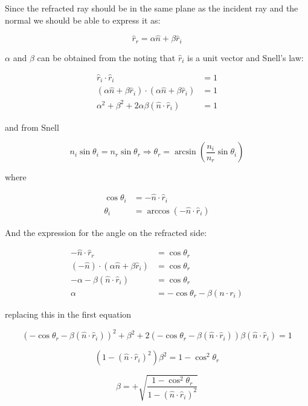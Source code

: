 \documentclass[10pt,a4paper]{article}
\begin{document}
Since the refracted ray should be in the same plane as the incident ray and the normal we should be able to express it as:

\[
\hat r_r = \alpha  \hat n + \beta \hat r_i
\]

$\alpha$ and $\beta$ can be obtained from the noting that $\hat r_i$ is a unit vector 
and Snell's law:

\begin{align*}
\hat r_i \cdot \hat r_i                                                   & = 1 \\
(\alpha  \hat n + \beta \hat r_i) \cdot (\alpha  \hat n + \beta \hat r_i) & = 1 \\
\alpha^2 + \beta^2 + 2 \alpha \beta (\hat n \cdot \hat r_i)               & = 1 
\end{align*}


and from Snell

\[
n_i \sin{\theta_i} = n_r \sin{\theta_r}
\Rightarrow
\theta_r = \arcsin{ \left( \dfrac{n_i}{n_r}\sin{\theta_i} \right) }
\]

where

\begin{align*}
\cos \theta_i  & = -\hat n \cdot \hat r_i                          \\
\theta_i       & = \arccos{\left( -\hat n \cdot \hat r_i \right)} 
\end{align*}



And the expression for the angle on the refracted side:

\begin{align*}
-\hat n \cdot \hat r_r                          & = \cos\theta_r  \\
(-\hat n)\cdot (\alpha \hat n +\beta \hat r_i)  & = \cos\theta_r  \\
-\alpha-\beta (\hat n\cdot \hat r_i)            & = \cos\theta_r  \\
\alpha                           & = -\cos\theta_r -\beta(n \cdot r_i) 
\end{align*}


replacing this in the first equation

\[
(- \cos\theta_r - \beta (\hat n \cdot \hat r_i))^2+ \beta^2 + 2(-\cos\theta_r-\beta(\hat n\cdot \hat r_i))\beta(\hat n \cdot \hat r_i)=1
\]

\[
(1-(\hat n\cdot \hat r_i)^2)\beta^2 = 1-\cos^2\theta_r
\]

\[
\beta = + \sqrt{\dfrac{1-\cos^2\theta_r}{1-(\hat n \cdot \hat r_i)^2}}
\]
\end{document}
